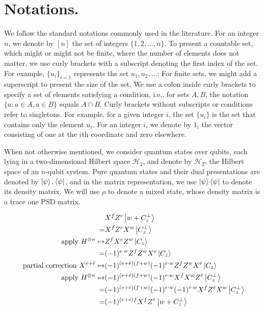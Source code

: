 
  \section{ Notations. } \label{sec:nota}
We follow the standard notations commonly used in the literature. For an integer $n$, we denote by $[n]$ the set of integers $\{1, 2, \ldots, n\}$. To present a countable set, which might or might not be finite, where the number of elements does not matter, we use curly brackets with a subscript denoting the first index of the set. For example, $\{u_{i}\}_{i=1}$ represents the set $u_{1}, u_{2}, \ldots$; For finite sets, we might add a superscript to present the size of the set. We use a colon inside curly brackets to specify a set of elements satisfying a condition, i.e., for sets $A, B$, the notation $\{ a : a \in A, a \in B \}$ equals $A \cap B$. Curly brackets without subscripts or conditions refer to singletons. For example, for a given integer $i$, the set $\{u_{i}\}$ is the set that contains only the element $u_{i}$. For an integer $i$, we denote by $1_{i}$ the vector consisting of one at the $i$th coordinate and zero elsewhere.

  When not otherwise mentioned, we consider quantum states over qubits, each lying in a two-dimensional Hilbert space $\mathcal{H}_{2}$, and denote by $\mathcal{H}_{2^n}$ the Hilbert space of an $n$-qubit system. Pure quantum states and their dual presentations are denoted by $\ket{\psi}, \bra{\psi}$, and in the matrix representation, we use $\ket{\psi}\bra{\psi}$ to denote its density matrix. We will use $\rho$ to denote a mixed state, whose density matrix is a trace one PSD matrix. 



\begin{equation*}
  \begin{split}
     & X^{f}Z^{e} \ket { w + C_{z}^{\perp} } \\
     = & X^{f}Z^{e}X^{w} \ket { C_{z}^{\perp} } \\
     \text{apply } H^{\otimes n } \mapsto & Z^{f}X^{e}Z^{w}\ket { C_{z} } \\
     = & (-1)^{e \cdot w} Z^{f}Z^{w}X^{e}\ket { C_{z} } \\
     \text{ partial correction } X^{e +\hat{e}} \mapsto & (-1)^{(e+\hat{e}) (f+w) } (-1)^{e \cdot w} Z^{f}Z^{w}X^{\hat{e}}\ket { C_{z} } \\
     \text{apply } H^{\otimes n } \mapsto & (-1)^{(e+\hat{e}) (f+w) } (-1)^{e \cdot w} X^{f}X^{w}Z^{\hat{e}}\ket { C_{z}^{\perp} } \\
     = & (-1)^{(e+\hat{e}) (f+w) } (-1)^{e \cdot w} (-1)^{\hat{e} \cdot w} X^{f}Z^{\hat{e}}X^{w}\ket { C_{z}^{\perp} } \\
     = & (-1)^{(e+\hat{e}) f } X^{f}Z^{\hat{e}}\ket { w + C_{z}^{\perp}  } \\
  \end{split}
\end{equation*}

